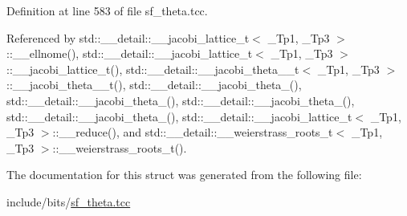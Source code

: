 Definition at line 583 of file sf\+\_\+theta.\+tcc.



Referenced by std\+::\+\_\+\+\_\+detail\+::\+\_\+\+\_\+jacobi\+\_\+lattice\+\_\+t$<$ \+\_\+\+Tp1, \+\_\+\+Tp3 $>$\+::\+\_\+\+\_\+ellnome(), std\+::\+\_\+\+\_\+detail\+::\+\_\+\+\_\+jacobi\+\_\+lattice\+\_\+t$<$ \+\_\+\+Tp1, \+\_\+\+Tp3 $>$\+::\+\_\+\+\_\+jacobi\+\_\+lattice\+\_\+t(), std\+::\+\_\+\+\_\+detail\+::\+\_\+\+\_\+jacobi\+\_\+theta\+\_\+\_\+t$<$ \+\_\+\+Tp1, \+\_\+\+Tp3 $>$\+::\+\_\+\+\_\+jacobi\+\_\+theta\+\_\+\_\+t(), std\+::\+\_\+\+\_\+detail\+::\+\_\+\+\_\+jacobi\+\_\+theta\+\_(), std\+::\+\_\+\+\_\+detail\+::\+\_\+\+\_\+jacobi\+\_\+theta\+\_(), std\+::\+\_\+\+\_\+detail\+::\+\_\+\+\_\+jacobi\+\_\+theta\+\_(), std\+::\+\_\+\+\_\+detail\+::\+\_\+\+\_\+jacobi\+\_\+theta\+\_(), std\+::\+\_\+\+\_\+detail\+::\+\_\+\+\_\+jacobi\+\_\+lattice\+\_\+t$<$ \+\_\+\+Tp1, \+\_\+\+Tp3 $>$\+::\+\_\+\+\_\+reduce(), and std\+::\+\_\+\+\_\+detail\+::\+\_\+\+\_\+weierstrass\+\_\+roots\+\_\+t$<$ \+\_\+\+Tp1, \+\_\+\+Tp3 $>$\+::\+\_\+\+\_\+weierstrass\+\_\+roots\+\_\+t().



The documentation for this struct was generated from the following file\+:\begin{DoxyCompactItemize}
\item 
include/bits/\hyperlink{sf__theta_8tcc}{sf\+\_\+theta.\+tcc}\end{DoxyCompactItemize}
